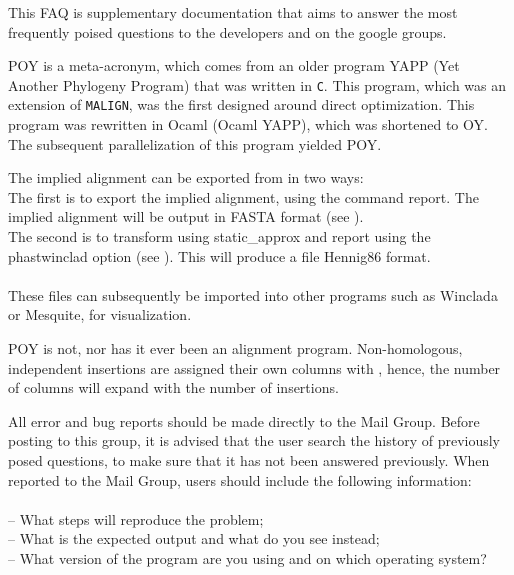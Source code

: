 This FAQ is supplementary documentation that aims to answer the
most frequently poised questions to the \poy developers and on the
\poy google groups.

\renewcommand{\cftdotsep}{\cftnodots} %
\listofquestions
\newpage


{POY is a meta-acronym, which comes from an older program YAPP (Yet
Another Phylogeny Program) that was written in \texttt{C}.  This
program, which was an extension of \texttt{MALIGN}, was the first
designed around direct optimization.  This program was rewritten
in Ocaml (Ocaml YAPP), which was shortened to OY.  The subsequent
parallelization of this program yielded POY.}

{The implied alignment can be exported from \poy in two ways:  \\

The first is to export the implied alignment, using the command report.
The implied alignment will be output in FASTA format 
(see ).  \\

The second is to transform using static\_approx and report using
the phastwinclad option (see ). 
This will produce a file Hennig86 format.\\
\\
These files can subsequently be imported into other programs such as 
Winclada or Mesquite, for visualization.}

{POY is not, nor has it ever been an alignment program. Non-homologous, 
independent insertions are assigned their own columns with \poy, hence, 
the number of columns will expand with the number of insertions.}

{All error and bug reports should be made directly to the \poy Mail
Group. Before posting to this group, it is advised that the user
search the history of previously posed questions, to make sure that
it has not been answered previously.  When reported to the Mail
Group, users should include the following information: \\
\\
-- What steps will reproduce the problem; \\
-- What is the expected output and what do you see instead; \\
-- What version of the program are you using and on which operating system?}

